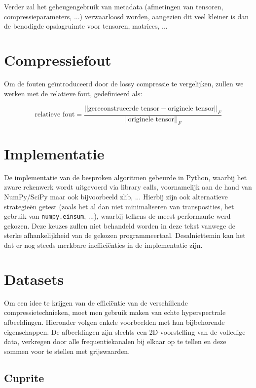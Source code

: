 Verder zal het geheugengebruik van metadata (afmetingen van tensoren, compressieparameters, ...) verwaarloosd worden, aangezien dit veel kleiner is dan de benodigde opslagruimte voor tensoren, matrices, ...

\section{Compressiefout}

Om de fouten ge\"introduceerd door de lossy compressie te vergelijken, zullen we werken met de relatieve fout, gedefinieerd als:

\[
\text{relatieve fout} = \frac{||\text{gereconstrueerde tensor} - \text{originele tensor}||_F}{||\text{originele tensor}||_F}
\]

\section{Implementatie}

De implementatie van de besproken algoritmen gebeurde in Python, waarbij het zware rekenwerk wordt uitgevoerd via library calls, voornamelijk aan de hand van NumPy/SciPy maar ook bijvoorbeeld zlib, ... Hierbij zijn ook alternatieve strategie\"en getest (zoals het al dan niet minimaliseren van transposities, het gebruik van \texttt{numpy.einsum}, ...), waarbij telkens de meest performante werd gekozen. Deze keuzes zullen niet behandeld worden in deze tekst vanwege de sterke afhankelijkheid van de gekozen programmeertaal. Desalniettemin kan het dat er nog steeds merkbare ineffici\"enties in de implementatie zijn.

\newpage
\section{Datasets}

Om een idee te krijgen van de effici\"entie van de verschillende compressietechnieken, moet men gebruik maken van echte hyperspectrale afbeeldingen. Hieronder volgen enkele voorbeelden met hun bijbehorende eigenschappen. De afbeeldingen zijn slechts een 2D-voorstelling van de volledige data, verkregen door alle frequentiekanalen bij elkaar op te tellen en deze sommen voor te stellen met grijswaarden.

\subsection{Cuprite}

